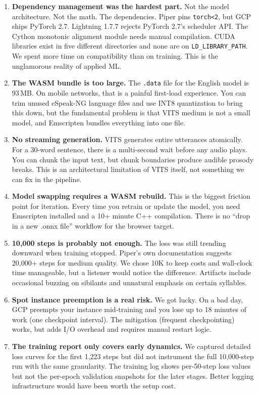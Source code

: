 \documentclass[10pt,a4paper,twocolumn]{article}
\begin{document}
\begin{enumerate}
    \item \textbf{Dependency management was the hardest part.} Not the model architecture. Not the math. The dependencies. Piper pins \texttt{torch<2}, but GCP ships PyTorch 2.7. Lightning 1.7.7 rejects PyTorch 2.7's scheduler API. The Cython monotonic alignment module needs manual compilation. CUDA libraries exist in five different directories and none are on \texttt{LD\_LIBRARY\_PATH}. We spent more time on compatibility than on training. This is the unglamorous reality of applied ML.

    \item \textbf{The WASM bundle is too large.} The \texttt{.data} file for the English model is 93\,MB. On mobile networks, that is a painful first-load experience. You can trim unused eSpeak-NG language files and use INT8 quantization to bring this down, but the fundamental problem is that VITS medium is not a small model, and Emscripten bundles everything into one file.

    \item \textbf{No streaming generation.} VITS generates entire utterances atomically. For a 30-word sentence, there is a multi-second wait before any audio plays. You can chunk the input text, but chunk boundaries produce audible prosody breaks. This is an architectural limitation of VITS itself, not something we can fix in the pipeline.

    \item \textbf{Model swapping requires a WASM rebuild.} This is the biggest friction point for iteration. Every time you retrain or update the model, you need Emscripten installed and a 10+ minute C++ compilation. There is no ``drop in a new .onnx file'' workflow for the browser target.

    \item \textbf{10,000 steps is probably not enough.} The loss was still trending downward when training stopped. Piper's own documentation suggests 20,000+ steps for medium quality. We chose 10K to keep costs and wall-clock time manageable, but a listener would notice the difference. Artifacts include occasional buzzing on sibilants and unnatural emphasis on certain syllables.

    \item \textbf{Spot instance preemption is a real risk.} We got lucky. On a bad day, GCP preempts your instance mid-training and you lose up to 18 minutes of work (one checkpoint interval). The mitigation (frequent checkpointing) works, but adds I/O overhead and requires manual restart logic.

    \item \textbf{The training report only covers early dynamics.} We captured detailed loss curves for the first 1,223 steps but did not instrument the full 10,000-step run with the same granularity. The training log shows per-50-step loss values but not the per-epoch validation snapshots for the later stages. Better logging infrastructure would have been worth the setup cost.
\end{enumerate}
\end{document}
